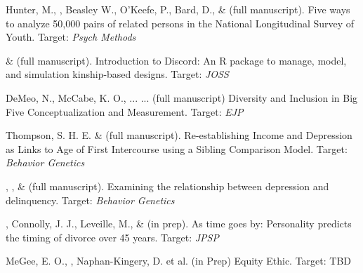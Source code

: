 \item Hunter, M., \meb, Beasley W., O'Keefe, P.,  Bard, D., \& \Joe (full manuscript). Five ways to analyze 50,000 pairs of related persons in the National Longitudinal Survey of Youth.  Target: \textit{Psych Methods}

\item \jt \& \meb (full manuscript). Introduction to Discord: An R package to manage, model, and simulation kinship-based designs. Target: \textit{JOSS}

\item DeMeo, N., McCabe, K. O., ... \meb ... (full manuscript) Diversity and Inclusion in Big Five Conceptualization and Measurement.  Target: \textit{EJP}

\item Thompson, S. H. E. \noteA \& \meb (full manuscript). Re-establishing Income and Depression as Links to Age of First Intercourse using a Sibling Comparison Model. Target: \textit{Behavior Genetics}

\item \emsims, \jt, \& \meb (full manuscript). Examining the relationship between depression and delinquency. Target: \textit{Behavior Genetics}



%
\item \meb, Connolly, J. J., Leveille, M., \& \jjj (in prep). As time goes by: Personality predicts the timing of divorce over 45 years. Target: \textit{JPSP}
%

\item MeGee, E. O., \meb, Naphan-Kingery, D. et al. (in Prep) Equity Ethic. Target: TBD










